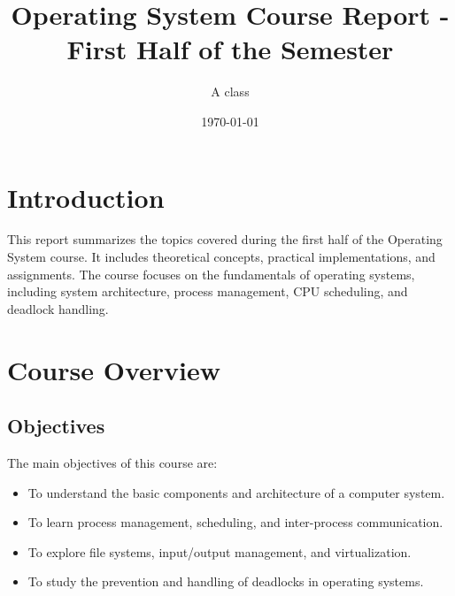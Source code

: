 \documentclass[12pt]{article}
\title{Operating System Course Report - First Half of the Semester}
\author{A class}
\date{\today}
\begin{document}
\maketitle
\newpage

\tableofcontents
\newpage

\section{Introduction}
This report summarizes the topics covered during the first half of the Operating System course. It includes theoretical concepts, practical implementations, and assignments. The course focuses on the fundamentals of operating systems, including system architecture, process management, CPU scheduling, and deadlock handling.

\section{Course Overview}
\subsection{Objectives}
The main objectives of this course are:
\begin{itemize}
    \item To understand the basic components and architecture of a computer system.
    \item To learn process management, scheduling, and inter-process communication.
    \item To explore file systems, input/output management, and virtualization.
    \item To study the prevention and handling of deadlocks in operating systems.
\end{itemize}
\end{document}
